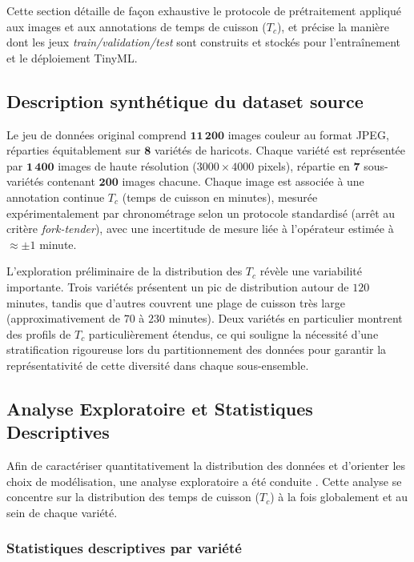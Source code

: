   Cette section détaille de façon exhaustive le protocole de prétraitement appliqué aux images et aux annotations de temps de cuisson ($T_c$), et précise la manière dont les jeux \emph{train/validation/test} sont construits et stockés pour l'entraînement et le déploiement TinyML.

  \subsection{Description synthétique du dataset source}

  Le jeu de données original comprend \(\mathbf{11\,200}\) images couleur au format JPEG, réparties équitablement sur \(\mathbf{8}\) variétés de haricots. Chaque variété est représentée par \(\mathbf{1\,400}\) images de haute résolution (\(3000\times4000\) pixels), répartie en \(\mathbf{7}\) sous-variétés contenant \(\mathbf{200}\) images chacune. Chaque image est associée à une annotation continue \(T_c\) (temps de cuisson en minutes), mesurée expérimentalement par chronométrage selon un protocole standardisé (arrêt au critère \emph{fork-tender}), avec une incertitude de mesure liée à l'opérateur estimée à \(\approx\pm 1\) minute.

  L’exploration préliminaire de la distribution des $T_c$ révèle une variabilité importante. Trois variétés présentent un pic de distribution autour de $120$ minutes, tandis que d'autres couvrent une plage de cuisson très large (approximativement de $70$ à $230$ minutes). Deux variétés en particulier montrent des profils de $T_c$ particulièrement étendus, ce qui souligne la nécessité d'une stratification rigoureuse lors du partitionnement des données pour garantir la représentativité de cette diversité dans chaque sous-ensemble.


  \subsection{Analyse Exploratoire et Statistiques Descriptives}

  Afin de caractériser quantitativement la distribution des données et d'orienter les choix de modélisation, une analyse exploratoire a été conduite \citep{tukey1977exploratory}. Cette analyse se concentre sur la distribution des temps de cuisson ($T_c$) à la fois globalement et au sein de chaque variété.

  \subsubsection{Statistiques descriptives par variété}

